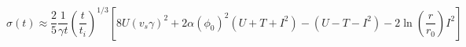 \begin{equation}
\sigma(t) \approx  \frac{2}{5} \frac{1}{\gamma t} \left(\frac{t}{t_i}\right)^{1/3} \left[
8U (v_s\gamma)^2 + 2\alpha(\phi_0)^2 \left(U+T+I^2\right)- \left( U-T-I^2\right) - 2\ln\left(\frac{r}{r_0}\right)I^2  \right]
\end{equation}

